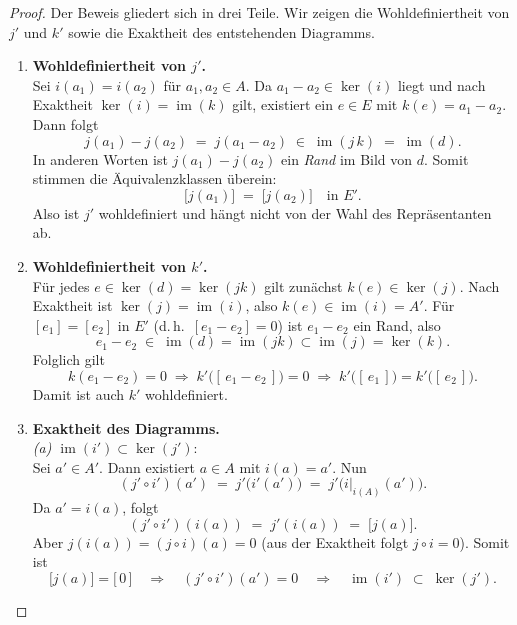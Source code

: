 \documentclass[12pt, hidelinks]{article}
\numberwithin{conj}{section}
\newcommand{\ima}{\operatorname{im}}
\begin{document}
\begin{proof}
    Der Beweis gliedert sich in drei Teile. Wir zeigen die Wohldefiniertheit von $j'$ und $k'$ sowie die Exaktheit des entstehenden Diagramms.

    \begin{enumerate}[nolistsep]
        \item \textbf{Wohldefiniertheit von $j'$.} \\
        Sei $i(a_1) = i(a_2)$ für $a_1, a_2 \in A$. Da $a_1 - a_2 \in \ker(i)$ liegt und nach Exaktheit $\ker(i) = \ima(k)$ gilt, existiert ein $e \in E$ mit $k(e) = a_1 - a_2$. Dann folgt
        \[
            j(a_1) - j(a_2) \;=\; j(a_1 - a_2)
            \;\in\; \ima(j\,k) \;=\; \ima(d).
        \]
        In anderen Worten ist $j(a_1) - j(a_2)$ ein \emph{Rand} im Bild von $d$. Somit stimmen die Äquivalenzklassen überein:
        \[
            \bigl[j(a_1)\bigr]
            \;=\;
            \bigl[j(a_2)\bigr]
            \quad\text{in } E'.
        \]
        Also ist $j'$ wohldefiniert und hängt nicht von der Wahl des Repräsentanten ab.

        \item \textbf{Wohldefiniertheit von $k'$.} \\
        Für jedes $e \in \ker(d) = \ker(jk)$ gilt zunächst $k(e) \in \ker(j)$. Nach Exaktheit ist $\ker(j) = \ima(i)$, also $k(e) \in \ima(i) = A'$. Für $[e_1] = [e_2]$ in $E'$ (d.\,h.\ $[e_1 - e_2] = 0$) ist $e_1 - e_2$ ein Rand, also
        \[
            e_1 - e_2 \;\in\; \ima(d) = \ima(jk) \subset \ima(j) = \ker(k).
        \]
        Folglich gilt
        \[
            k(e_1 - e_2) = 0
            \;\Longrightarrow\;
            k'\bigl([\,e_1 - e_2\,]\bigr) = 0
            \;\Longrightarrow\;
            k'\bigl([\,e_1\,]\bigr) = k'\bigl([\,e_2\,]\bigr).
        \]
        Damit ist auch $k'$ wohldefiniert.

        \item \textbf{Exaktheit des Diagramms.} \\
        \emph{(a) $\ima(i') \subset \ker(j')$}:\\
        Sei $a' \in A'$. Dann existiert $a \in A$ mit $i(a) = a'$. Nun
        \[
            (j' \circ i')(a')
            \;=\;
            j'\bigl(i'(a')\bigr)
            \;=\;
            j'\bigl(i\vert_{i(A)}(a')\bigr).
        \]
        Da $a' = i(a)$, folgt
        \[
            (j' \circ i')(i(a))
            \;=\; j'(i(a))
            \;=\; \bigl[j(a)\bigr].
        \]
        Aber $j(i(a)) = (j \circ i)(a) = 0$ (aus der Exaktheit folgt $j \circ i = 0$). Somit ist
        \[
            \bigl[j(a)\bigr] = \bigl[\,0\,\bigr]
            \quad\Longrightarrow\quad
            (j' \circ i')(a') = 0
            \quad\Longrightarrow\quad
            \ima(i') \;\subset\; \ker(j').
        \]


\end{enumerate}
\end{proof}
\end{document}
